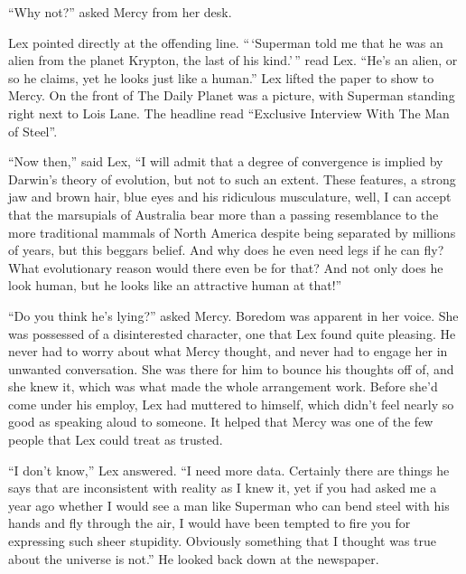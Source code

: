 \documentclass[ebook,12pt]{memoir}
\begin{document}
``Why not?'' asked Mercy from her desk.

Lex pointed directly at the offending line. ``\,`Superman told me that
he was an alien from the planet Krypton, the last of his kind.'\,'' read
Lex. ``He's an alien, or so he claims, yet he looks just like a human.''
Lex lifted the paper to show to Mercy. On the front of The Daily Planet
was a picture, with Superman standing right next to Lois Lane. The
headline read ``Exclusive Interview With The Man of Steel''.

``Now then,'' said Lex, ``I will admit that a degree of convergence is
implied by Darwin's theory of evolution, but not to such an extent.
These features, a strong jaw and brown hair, blue eyes and his
ridiculous musculature, well, I can accept that the marsupials of
Australia bear more than a passing resemblance to the more traditional
mammals of North America despite being separated by millions of years,
but this beggars belief. And why does he even need legs if he can fly?
What evolutionary reason would there even be for that? And not only does
he look human, but he looks like an attractive human at that!''

``Do you think he's lying?'' asked Mercy. Boredom was apparent in her
voice. She was possessed of a disinterested character, one that Lex
found quite pleasing. He never had to worry about what Mercy thought,
and never had to engage her in unwanted conversation. She was there for
him to bounce his thoughts off of, and she knew it, which was what made
the whole arrangement work. Before she'd come under his employ, Lex had
muttered to himself, which didn't feel nearly so good as speaking aloud
to someone. It helped that Mercy was one of the few people that Lex
could treat as trusted.

``I don't know,'' Lex answered. ``I need more data. Certainly there are
things he says that are inconsistent with reality as I knew it, yet if
you had asked me a year ago whether I would see a man like Superman who
can bend steel with his hands and fly through the air, I would have been
tempted to fire you for expressing such sheer stupidity. Obviously
something that I thought was true about the universe is not.'' He looked
back down at the newspaper.
\end{document}
